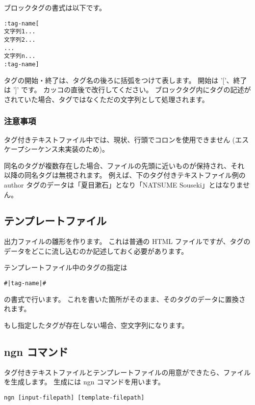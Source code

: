 \documentclass[a4j]{jsarticle}
\begin{document}
ブロックタグの書式は以下です。
\begin{lstlisting}[caption=ブロックタグの書式]
:tag-name[
文字列1...
文字列2...
...
文字列n...
:tag-name]
\end{lstlisting}
タグの開始・終了は、タグ名の後ろに括弧をつけて表します。
開始は '['、終了は ']' です。
カッコの直後で改行してください。
ブロックタグ内にタグの記述がされていた場合、タグではなくただの文字列として処理されます。


\subsubsection{注意事項}
タグ付きテキストファイル中では、現状、行頭でコロンを使用できません 
(エスケープシーケンス未実装のため)。

同名のタグが複数存在した場合、ファイルの先頭に近いものが保持され、それ以降の同名タグは無視されます。
例えば、下のタグ付きテキストファイル例の author タグのデータは「夏目漱石」となり「NATSUME Souseki」とはなりません。





\subsection{テンプレートファイル}
出力ファイルの雛形を作ります。
これは普通の HTML ファイルですが、タグのデータをどこに流し込むのか記述しておく必要があります。

テンプレートファイル中のタグの指定は
\begin{lstlisting}[caption=タグ指定の書式]
#|tag-name|#
\end{lstlisting}
の書式で行います。
これを書いた箇所がそのまま、そのタグのデータに置換されます。

もし指定したタグが存在しない場合、空文字列になります。




\subsection{ngn コマンド}
タグ付きテキストファイルとテンプレートファイルの用意ができたら、ファイルを生成します。
生成には ngn コマンドを用います。

\begin{lstlisting}[caption=ngn コマンドの使い方]
  ngn [input-filepath] [template-filepath]
\end{lstlisting}
\end{document}
